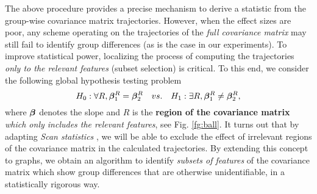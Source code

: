 
The above procedure provides a precise mechanism to derive a statistic from the group-wise covariance matrix trajectories.
However, when the effect sizes are poor, any scheme operating on 
the trajectories of the {\em full covariance matrix} may still fail to identify group differences (as is the case in our experiments). To improve statistical power, localizing the process of computing the trajectories {\em 
  only to the relevant features} (subset selection) is critical. 
%
%
To this end, we consider the following global hypothesis testing problem
\begin{equation*}
H_0: \forall R, \bm{\beta}_1^R=\bm{\beta}_2^R \quad vs. \quad H_1: \exists R, \bm{\beta}_1^R\ne\bm{\beta}_2^R,
\end{equation*}       
where $\bm{\beta}$ denotes the slope and $R$ is the \textbf{region of the covariance matrix}
{\em which only includes the relevant features}, see Fig. \ref{fg:ball}.
It turns out that by adapting {\em Scan statistics} \citep{fan2012control, arias2011detection}, we will be able to exclude the effect of irrelevant regions of the covariance 
matrix in the calculated trajectories. 
By extending this concept to graphs, we obtain an algorithm to identify {\em subsets of features} of the covariance matrix which show group differences that 
are otherwise unidentifiable, in a statistically rigorous way. 

